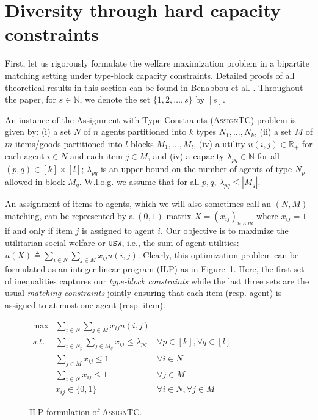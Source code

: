 \documentclass[11pt,dvipdfmx]{article}
\newcommand{\USW}{\mathtt{USW}}
\newcommand{\R}{\mathbb{R}}
\newcommand{\N}{\mathbb{N}}
\newcommand{\ASTC}{\textsc{AssignTC}\xspace}
\begin{document}
\section{Diversity through hard capacity constraints}\label{sec:assigntc}
First, let us rigorously formulate the welfare maximization problem in a bipartite matching setting under type-block capacity constraints. Detailed proofs of all theoretical results in this section can be found in Benabbou et al. \cite{benabbou2017diversity}. Throughout the paper, for $s \in \N$, we denote the set $\{1, 2,\ldots, s\}$ by $[s]$. 
\begin{definition}[\ASTC]\label{def:AwTC}
	An instance of the Assignment with Type Constraints (\ASTC) problem is given by: (i) a set $N$ of $n$ agents partitioned into $k$ types $N_1,\dots, N_k$, (ii) a set $M$ of $m$ items/goods partitioned into $l$ blocks $M_1,\dots,M_l$, (iv) a utility $u(i,j) \in \R_+$ for each agent $i \in N$ and each item $j \in M$, and (iv) a capacity $\lambda_{pq} \in \N$ for all $(p,q) \in [k]  \times [l]$; $\lambda_{pq}$ is an upper bound on the number of agents of type $N_p$ allowed in block $M_q$. W.l.o.g. we assume that for all $p,q$, $\lambda_{pq} \le |M_q|$.
\end{definition}
An assignment of items to agents, which we will also sometimes call an $(N,M)$-matching, can be represented by a $(0,1)$-matrix $X  =  (x_{ij})_{n \times m}$ where $x_{ij} = 1$ if and only if item $j$ is assigned to agent $i$.
Our objective is to maximize the utilitarian social welfare or $\USW$, i.e., the sum of agent utilities: $u(X) \triangleq \sum_{i \in N}\sum_{j \in M} x_{ij} u(i,j)$.
Clearly, this optimization problem can be formulated as an integer linear program (ILP) as in Figure~\ref{linprog}. Here, the first set of inequalities captures our \emph{type-block constraints} while the last three sets are the usual \emph{matching constraints} jointly ensuring that each item (resp. agent) is assigned to at most one agent (resp. item).
\begin{figure}
	\vspace{-20pt}
	\begin{center}
		$\boxed{\begin{aligned}
			\max  			& \sum_{i \in N}\sum_{j \in M} x_{ij} u(i,j) &\\
			\mathit{s.t.} & \sum_{i \in N_p} \sum_{j \in M_q} x_{ij} \le \lambda_{pq} & \forall p \in [k], \forall q \in [l]\\
			&   \sum_{j \in M} x_{ij} \le 1 & \forall i \in N\\
			& \sum_{i \in N}  x_{ij}  \le 1 & \forall j \in M \\
			& x_{ij} \in\{0,1\} & \forall i \in N, \forall j \in M
			\end{aligned}}$
		\caption{ILP formulation of \ASTC. \label{linprog}}
	\end{center}
\end{figure}
\end{document}
